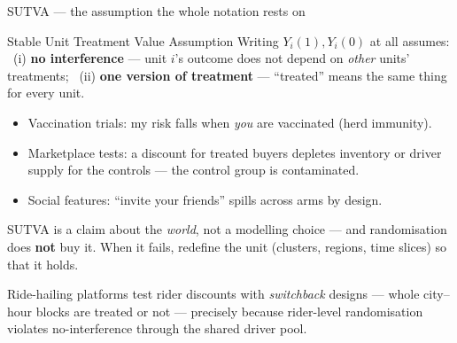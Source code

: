 \documentclass[aspectratio=169,11pt]{beamer}
\begin{document}
\begin{frame}{SUTVA --- the assumption the whole notation rests on}
  \begin{block}{Stable Unit Treatment Value Assumption}
    Writing $Y_i(1),Y_i(0)$ at all assumes: \ (i) \textbf{no interference} --- unit $i$'s
    outcome does not depend on \emph{other} units' treatments; \ (ii) \textbf{one version
    of treatment} --- ``treated'' means the same thing for every unit.
  \end{block}
  \begin{readme}
    \begin{itemize}
      \item Vaccination trials: my risk falls when \emph{you} are vaccinated (herd immunity).
      \item Marketplace tests: a discount for treated buyers depletes inventory or driver
            supply for the controls --- the control group is contaminated.
      \item Social features: ``invite your friends'' spills across arms by design.
    \end{itemize}
    SUTVA is a claim about the \emph{world}, not a modelling choice --- and randomisation
    does \textbf{not} buy it. When it fails, redefine the unit (clusters, regions,
    time slices) so that it holds.
  \end{readme}
  \begin{industry}
    Ride-hailing platforms test rider discounts with \emph{switchback} designs ---
    whole city--hour blocks are treated or not --- precisely because rider-level
    randomisation violates no-interference through the shared driver pool.
  \end{industry}
\end{frame}
\end{document}
